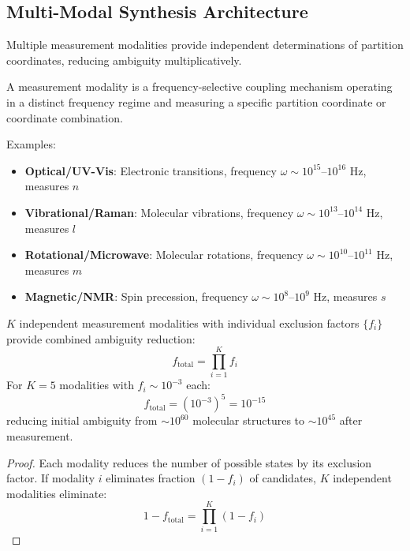 \begin{theorem}
\subsection{Multi-Modal Synthesis Architecture}

Multiple measurement modalities provide independent determinations of partition coordinates, reducing ambiguity multiplicatively.

\begin{definition}
\label{def:modality}
A measurement modality is a frequency-selective coupling mechanism operating in a distinct frequency regime and measuring a specific partition coordinate or coordinate combination.
\end{definition}

Examples:
\begin{itemize}
\item \textbf{Optical/UV-Vis}: Electronic transitions, frequency $\omega \sim 10^{15}$--$10^{16}$ Hz, measures $n$
\item \textbf{Vibrational/Raman}: Molecular vibrations, frequency $\omega \sim 10^{13}$--$10^{14}$ Hz, measures $l$
\item \textbf{Rotational/Microwave}: Molecular rotations, frequency $\omega \sim 10^{10}$--$10^{11}$ Hz, measures $m$
\item \textbf{Magnetic/NMR}: Spin precession, frequency $\omega \sim 10^{8}$--$10^{9}$ Hz, measures $s$
\end{itemize}

\begin{theorem}
\label{thm:ambiguity}
$K$ independent measurement modalities with individual exclusion factors $\{f_i\}$ provide combined ambiguity reduction:
\begin{equation}
f_{\text{total}} = \prod_{i=1}^{K} f_i
\end{equation}
For $K=5$ modalities with $f_i \sim 10^{-3}$ each:
\begin{equation}
f_{\text{total}} = (10^{-3})^5 = 10^{-15}
\end{equation}
reducing initial ambiguity from $\sim 10^{60}$ molecular structures to $\sim 10^{45}$ after measurement.
\end{theorem}

\begin{proof}
Each modality reduces the number of possible states by its exclusion factor. If modality $i$ eliminates fraction $(1 - f_i)$ of candidates, $K$ independent modalities eliminate:
\begin{equation}
1 - f_{\text{total}} = \prod_{i=1}^{K} (1 - f_i)
\end{equation}


\end{proof}
\end{theorem}

